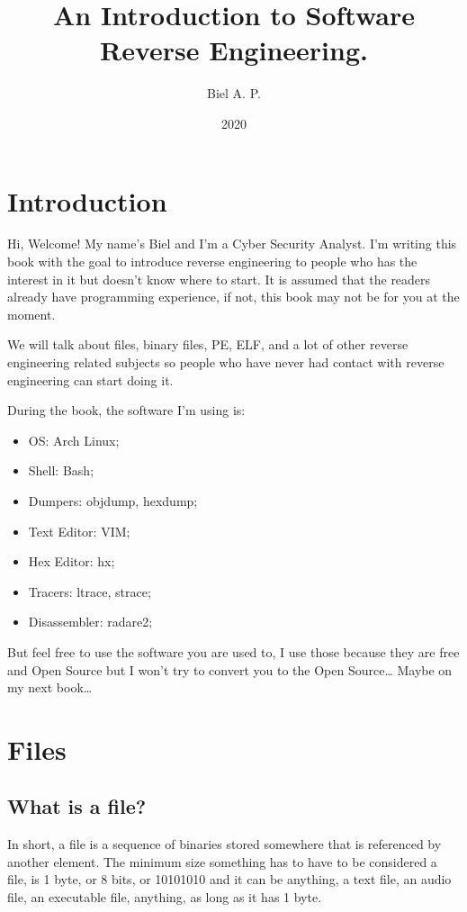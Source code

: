\documentclass[17pt, a4paper]{extarticle}
\author{Biel A. P.}
\date{2020}
\title{An Introduction to Software Reverse Engineering.}
\begin{document}
%
\maketitle
\newpage

\tableofcontents
\newpage

\section{Introduction}

Hi, Welcome! My name's Biel and I'm a Cyber Security Analyst. I'm writing this book with the goal to introduce reverse engineering to people who has the interest in it but doesn't know where to start. It is assumed that the readers already have programming experience, if not, this book may not be for you at the moment. 

We will talk about files, binary files, PE, ELF, and a lot of other reverse engineering related subjects so people who have never had contact with reverse engineering can start doing it.

During the book, the software I'm using is:

\begin{itemize}
\item OS: Arch Linux;
\item Shell: Bash;
\item Dumpers: objdump, hexdump;
\item Text Editor: VIM;
\item Hex Editor: hx;
\item Tracers: ltrace, strace;
\item Disassembler: radare2;
\end{itemize}

But feel free to use the software you are used to, I use those because they are free and Open Source but I won't try to convert you to the Open Source\ldots{} Maybe on my next book\ldots{}

\newpage

\section{Files}
\subsection{What is a file?}

In short, a file is a sequence of binaries stored somewhere that is referenced by another element. The minimum size something has to have to be considered a file, is 1 byte, or 8 bits, or 10101010 and it can be anything, a text file, an audio file, an executable file, anything, as long as it has 1 byte.
\end{document}
